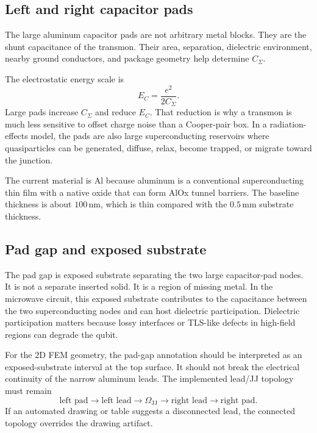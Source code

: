 \documentclass[11pt]{article}
\begin{document}
\subsection{Left and right capacitor pads}
The large aluminum capacitor pads are not arbitrary metal blocks. They are the shunt capacitance of the transmon. Their area, separation, dielectric environment, nearby ground conductors, and package geometry help determine $C_{\Sigma}$.

The electrostatic energy scale is
\begin{equation}
    E_C = \frac{e^2}{2C_{\Sigma}}.
\end{equation}
Large pads increase $C_{\Sigma}$ and reduce $E_C$. That reduction is why a transmon is much less sensitive to offset charge noise than a Cooper-pair box. In a radiation-effects model, the pads are also large superconducting reservoirs where quasiparticles can be generated, diffuse, relax, become trapped, or migrate toward the junction.

The current material is Al because aluminum is a conventional superconducting thin film with a native oxide that can form AlOx tunnel barriers. The baseline thickness is about $100\,\mathrm{nm}$, which is thin compared with the $0.5\,\mathrm{mm}$ substrate thickness.

\subsection{Pad gap and exposed substrate}
The pad gap is exposed substrate separating the two large capacitor-pad nodes. It is not a separate inserted solid. It is a region of missing metal. In the microwave circuit, this exposed substrate contributes to the capacitance between the two superconducting nodes and can host dielectric participation. Dielectric participation matters because lossy interfaces or TLS-like defects in high-field regions can degrade the qubit.

For the 2D FEM geometry, the pad-gap annotation should be interpreted as an exposed-substrate interval at the top surface. It should not break the electrical continuity of the narrow aluminum leads. The implemented lead/JJ topology must remain
\begin{equation}
    \text{left pad} \rightarrow \text{left lead} \rightarrow \Omega_{\mathrm{JJ}} \rightarrow \text{right lead} \rightarrow \text{right pad}.
\end{equation}
If an automated drawing or table suggests a disconnected lead, the connected topology overrides the drawing artifact.
\end{document}
